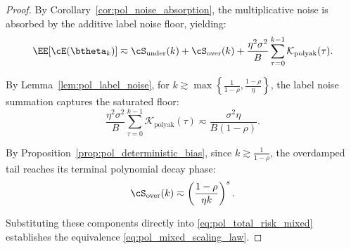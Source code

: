 \documentclass[11pt]{article}
\newcommand{\polyak}{\mathrm{polyak}}
\begin{document}
\begin{proof}
By Corollary~\ref{cor:pol_noise_absorption}, the multiplicative noise is absorbed by the additive label noise floor, yielding:
\begin{equation}
\label{eq:pol_total_risk_mixed}
    \EE[\cE(\btheta_k)] 
    \eqsim 
    \cS_{\mathrm{under}}(k) + \cS_{\mathrm{over}}(k) + \frac{\eta^2\sigma^2}{B}\sum_{\tau=0}^{k-1}\mathcal{K}_{\polyak}(\tau).
\end{equation}

By Lemma~\ref{lem:pol_label_noise}, for $k \gtrsim \max\left\{\frac{1}{1-\rho}, \frac{1-\rho}{\eta}\right\}$, the label noise summation captures the saturated floor:
\begin{equation*}
    \frac{\eta^2\sigma^2}{B}\sum_{\tau=0}^{k-1}\mathcal{K}_{\polyak}(\tau) 
    \eqsim 
    \frac{\sigma^2\eta}{B(1-\rho)}.
\end{equation*}

By Proposition~\ref{prop:pol_deterministic_bias}, since $k \gtrsim \frac{1}{1-\rho}$, the overdamped tail reaches its terminal polynomial decay phase:
\begin{equation*}
    \cS_{\mathrm{over}}(k) \eqsim \left(\frac{1-\rho}{\eta k}\right)^s.
\end{equation*}

Substituting these components directly into \eqref{eq:pol_total_risk_mixed} establishes the equivalence \eqref{eq:pol_mixed_scaling_law}.
\end{proof}




\end{document}
